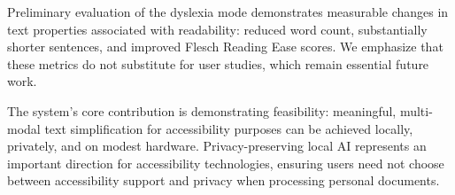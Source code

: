 \documentclass[11pt]{article}
\begin{document}
Preliminary evaluation of the dyslexia mode demonstrates measurable changes in text properties associated with readability: reduced word count, substantially shorter sentences, and improved Flesch Reading Ease scores. We emphasize that these metrics do not substitute for user studies, which remain essential future work.

The system's core contribution is demonstrating feasibility: meaningful, multi-modal text simplification for accessibility purposes can be achieved locally, privately, and on modest hardware. Privacy-preserving local AI represents an important direction for accessibility technologies, ensuring users need not choose between accessibility support and privacy when processing personal documents.


\end{document}
